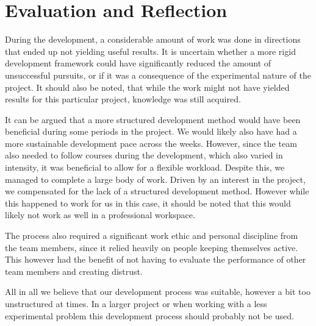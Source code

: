\section{Evaluation and Reflection}
During the development, a considerable amount of work was done in directions that ended up not yielding useful results. It is uncertain whether a more rigid development framework could have significantly reduced the amount of unsuccessful pursuits, or if it was a consequence of the experimental nature of the project. It should also be noted, that while the work might not have yielded results for this particular project, knowledge was still acquired.

It can be argued that a more structured development method would have been beneficial during some periods in the project. We would likely also have had a more sustainable development pace across the weeks. However, since the team also needed to follow courses during the development, which also varied in intensity, it was beneficial to allow for a flexible workload.
Despite this, we managed to complete a large body of work. Driven by an interest in the project, we compensated for the lack of a structured development method. However while this happened to work for us in this case, it should be noted that this would likely not work as well in a professional workspace.

The process also required a significant work ethic and personal discipline from the team members, since it relied heavily on people keeping themselves active. This however had the benefit of not having to evaluate the performance of other team members and creating distrust.

All in all we believe that our development process was suitable, however a bit too unstructured at times. In a larger project or when working with a less experimental problem this development process should probably not be used.



